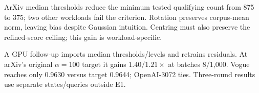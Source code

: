 ArXiv median thresholds reduce the minimum tested qualifying count from 875 to 375; two other workloads fail the criterion. Rotation preserves corpus-mean norm, leaving bias despite Gaussian intuition. Centring must also preserve the refined-score ceiling; this gain is workload-specific.

A GPU follow-up imports median thresholds/levels and retrains residuals. At arXiv's original $\alpha=100$ target it gains $1.40/1.21\times$ at batches 8/1,000. Vogue reaches only 0.9630 versus target 0.9644; OpenAI-3072 ties. Three-round results use separate states/queries outside E1.